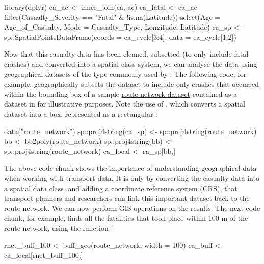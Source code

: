 \begin{Schunk}
\begin{Sinput}
library(dplyr)
ca_ac <- inner_join(ca, ac)
ca_fatal <- ca_ac %
  filter(Casualty_Severity == "Fatal" & !is.na(Latitude)) %
  select(Age = Age_of_Casualty, Mode = Casualty_Type, Longitude, Latitude)
ca_sp <- sp::SpatialPointsDataFrame(coords = ca_cycle[3:4], data = ca_cycle[1:2])
\end{Sinput}
\end{Schunk}

Now that this casualty data has been cleaned, subsetted (to only include
fatal crashes) and converted into a spatial class system, we can
analyse the data using geographical datasets of the type commonly used by
. The following code, for example, geographically
subsets the dataset to include only crashes that occurred within the
bounding box of a sample
\href{https://github.com/ropensci/stplanr/blob/master/data/route_network.rda?raw=true}{route
network dataset} contained as a dataset in  for illustrative purposes.
Note the use of , which converts a spatial
dataset into a box, represented as a rectangular
:

\begin{Schunk}
\begin{Sinput}
data("route_network")
sp::proj4string(ca_sp) <- sp::proj4string(route_network)
bb <- bb2poly(route_network)
sp::proj4string(bb) <- sp::proj4string(route_network)
ca_local <- ca_sp[bb,]
\end{Sinput}
\end{Schunk}

The above code chunk shows the importance of understanding geographical
data when working with transport data. It is only by converting the
casualty data into a spatial data class, and adding a coordinate
reference system (CRS), that transport planners and researchers can link
this important dataset back to the route network. We can now perform GIS
operations on the results. The next code chunk, for example, finds all
the fatalities that took place within 100 m of the route network, using
the function :

\begin{Schunk}
\begin{Sinput}
rnet_buff_100 <- buff_geo(route_network, width = 100)
ca_buff <- ca_local[rnet_buff_100,]
\end{Sinput}
\end{Schunk}

